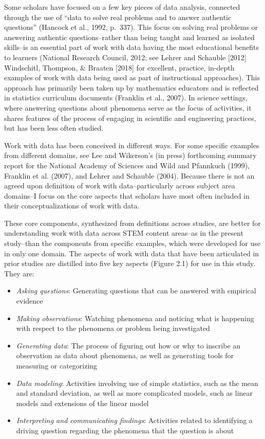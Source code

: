 \documentclass[]{book}
\providecommand{\tightlist}{%
  \setlength{\itemsep}{0pt}\setlength{\parskip}{0pt}}
\theoremstyle{definition}
\theoremstyle{definition}
\theoremstyle{definition}
\theoremstyle{remark}
\begin{document}
Some scholars have focused on a few key pieces of data analysis,
connected through the use of ``data to solve real problems and to answer
authentic questions'' (Hancock et al., 1992, p.~337). This focus on
solving real problems or answering authentic questions--rather than
being taught and learned as isolated skills--is an essential part of
work with data having the most educational benefits to learners
(National Research Council, 2012; see Lehrer and Schauble {[}2012{]}
Windschitl, Thompson, \& Braaten {[}2018{]} for excellent, practice,
in-depth examples of work with data being used as part of instructional
approaches). This approach has primarily been taken up by mathematics
educators and is reflected in statistics curriculum documents (Franklin
et al., 2007). In science settings, where answering questions about
phenomena serve as the focus of activities, it shares features of the
process of engaging in scientific and engineering practices, but has
been less often studied.

Work with data has been conceived in different ways. For some specific
examples from different domains, see Lee and Wikerson's (in press)
forthcoming summary report for the National Academy of Sciences and Wild
and Pfannkuch (1999), Franklin et al. (2007), and Lehrer and Schauble
(2004). Because there is not an agreed upon definition of work with
data--particularly across subject area domains--I focus on the core
aspects that scholars have most often included in their
conceptualizations of work with data.

These core components, synthesized from definitions across studies, are
better for understanding work with data across STEM content areas--as in
the present study--than the components from specific examples, which
were developed for use in only one domain. The aspects of work with data
that have been articulated in prior studies are distilled into five key
aspects (Figure 2.1) for use in this study. They are:

\begin{itemize}
\tightlist
\item
  \emph{Asking questions}: Generating questions that can be answered
  with empirical evidence
\item
  \emph{Making observations}: Watching phenomena and noticing what is
  happening with respect to the phenomena or problem being investigated
\item
  \emph{Generating data}: The process of figuring out how or why to
  inscribe an observation as data about phenomena, as well as generating
  tools for measuring or categorizing
\item
  \emph{Data modeling}: Activities involving use of simple statistics,
  such as the mean and standard deviation, as well as more complicated
  models, such as linear models and extensions of the linear model
\item
  \emph{Interpreting and communicating findings}: Activities related to
  identifying a driving question regarding the phenomena that the
  question is about
\end{itemize}
\end{document}
